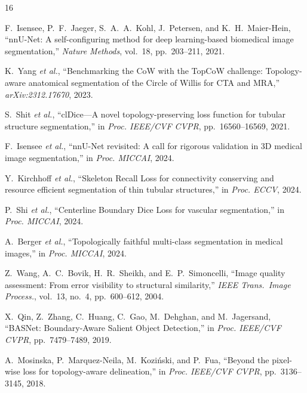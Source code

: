 \documentclass[conference]{IEEEtran}
\begin{document}
\begin{thebibliography}{16}
\scriptsize
\setlength{\itemsep}{-0.3ex}
\setlength{\parsep}{0pt}
\setlength{\parskip}{0pt}

F.~Isensee, P.~F.~Jaeger, S.~A.~A.~Kohl, J.~Petersen, and K.~H.~Maier-Hein,
``nnU-Net: A self-configuring method for deep learning-based biomedical image segmentation,''
\textit{Nature Methods}, vol.~18, pp.~203--211, 2021.

K.~Yang \textit{et al.},
``Benchmarking the CoW with the TopCoW challenge: Topology-aware anatomical segmentation of the Circle of Willis for CTA and MRA,''
\textit{arXiv:2312.17670}, 2023.

S.~Shit \textit{et al.},
``clDice---A novel topology-preserving loss function for tubular structure segmentation,''
in \textit{Proc. IEEE/CVF CVPR}, pp.~16560--16569, 2021.

F.~Isensee \textit{et al.},
``nnU-Net revisited: A call for rigorous validation in 3D medical image segmentation,''
in \textit{Proc. MICCAI}, 2024.

Y.~Kirchhoff \textit{et al.},
``Skeleton Recall Loss for connectivity conserving and resource efficient segmentation of thin tubular structures,''
in \textit{Proc. ECCV}, 2024.

P.~Shi \textit{et al.},
``Centerline Boundary Dice Loss for vascular segmentation,''
in \textit{Proc. MICCAI}, 2024.

A.~Berger \textit{et al.},
``Topologically faithful multi-class segmentation in medical images,''
in \textit{Proc. MICCAI}, 2024.

Z.~Wang, A.~C.~Bovik, H.~R.~Sheikh, and E.~P.~Simoncelli,
``Image quality assessment: From error visibility to structural similarity,''
\textit{IEEE Trans.\ Image Process.}, vol.~13, no.~4, pp.~600--612, 2004.

X.~Qin, Z.~Zhang, C.~Huang, C.~Gao, M.~Dehghan, and M.~Jagersand,
``BASNet: Boundary-Aware Salient Object Detection,''
in \textit{Proc. IEEE/CVF CVPR}, pp.~7479--7489, 2019.

A.~Mosinska, P.~Marquez-Neila, M.~Koziński, and P.~Fua,
``Beyond the pixel-wise loss for topology-aware delineation,''
in \textit{Proc. IEEE/CVF CVPR}, pp.~3136--3145, 2018.


\end{thebibliography}
\end{document}
